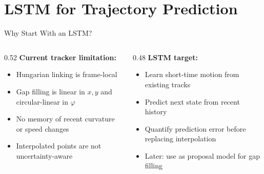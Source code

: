 
\section[LSTM Tracking]{LSTM for Trajectory Prediction}

\begin{frame}{Why Start With an LSTM?}
\begin{columns}
\begin{column}{0.52\textwidth}
\textbf{Current tracker limitation:}
\begin{itemize}\small
    \item Hungarian linking is frame-local
    \item Gap filling is linear in $x,y$ and circular-linear in $\varphi$
    \item No memory of recent curvature or speed changes
    \item Interpolated points are not uncertainty-aware
\end{itemize}
\end{column}
\begin{column}{0.48\textwidth}
\textbf{LSTM target:}
\begin{itemize}\small
    \item Learn short-time motion from existing tracks
    \item Predict next state from recent history
    \item Quantify prediction error before replacing interpolation
    \item Later: use as proposal model for gap filling
\end{itemize}
\end{column}
\end{columns}
\end{frame}

